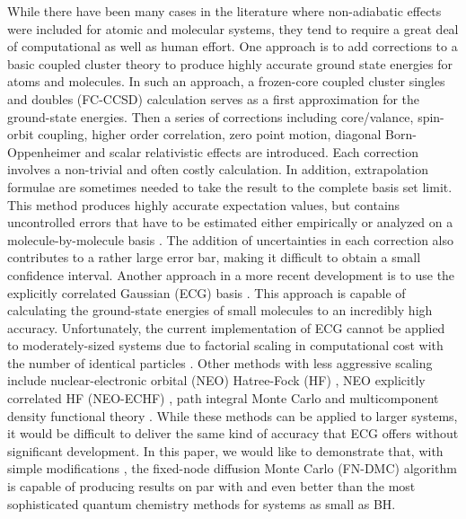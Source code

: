 While there have been many cases in the literature where non-adiabatic effects were included for atomic and molecular systems, they tend to require a great deal of computational as well as human effort. One approach is to add corrections to a basic coupled cluster theory to produce highly accurate ground state energies for atoms and molecules\cite{Feller_Corrections}. In such an approach, a frozen-core coupled cluster singles and doubles (FC-CCSD) \cite{Purvis_CCSD} calculation serves as a first approximation for the ground-state energies. Then a series of corrections including core/valance, spin-orbit coupling, higher order correlation, zero point motion, diagonal Born-Oppenheimer and scalar relativistic effects are introduced. Each correction involves a non-trivial and often costly calculation. In addition, extrapolation formulae are sometimes needed to take the result to the complete basis set limit. This method produces highly accurate expectation values, but contains uncontrolled errors that have to be estimated either empirically or analyzed on a molecule-by-molecule basis \cite{Feller_Error}. The addition of uncertainties in each correction also contributes to a rather large error bar, making it difficult to obtain a small confidence interval. Another approach in a more recent development is to use the explicitly correlated Gaussian (ECG) basis \cite{Adamowicz_ECG,Mitroy_ECG}. This approach is capable of calculating the ground-state energies of small molecules to an incredibly high accuracy. Unfortunately, the current implementation of ECG cannot be applied to moderately-sized systems due to factorial scaling in computational cost with the number of identical particles \cite{Bubin_BH_noBO}. Other methods with less aggressive scaling include nuclear-electronic orbital (NEO) Hatree-Fock (HF) \cite{Sharon_NEO}, NEO explicitly correlated HF (NEO-ECHF) \cite{Sharon_NEOX,Sharon_NEOX1,Sharon_NEOX2}, path integral Monte Carlo \cite{Ilkka_Path,Ilkka_Path1,Ilkka_Path2} and multicomponent density functional theory \cite{Sharon_NEO-DFT,Sharon_NEO-DFT1,Sharon_NEO-DFT2,Sharon_NEO-DFT3,Gross_NEO-DFT,Gross_NEO-DFT1}. While these methods can be applied to larger systems, it would be difficult to deliver the same kind of accuracy that ECG offers without significant development. In this paper, we would like to demonstrate that, with simple modifications \cite{Tubman_ECG}, the fixed-node diffusion Monte Carlo (FN-DMC) algorithm is capable of producing results on par with and even better than the most sophisticated quantum chemistry methods for systems as small as BH.